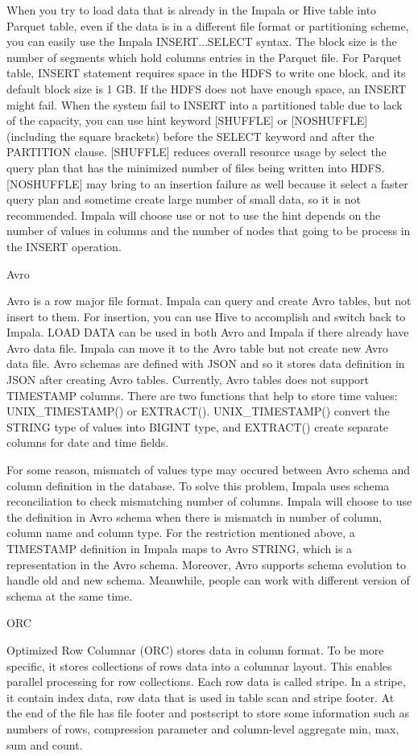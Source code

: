 \documentclass[onecolumn, draftclsnofoot,10pt, compsoc]{IEEEtran}
\begin{document}
When you try to load data that is already in the Impala or Hive table into Parquet table, even if the data is in a different file format or partitioning scheme, you can easily use the Impala INSERT...SELECT syntax.
The block size is the number of segments which hold columns entries in the Parquet file. 
For Parquet table, INSERT statement  requires space in the HDFS to write one block, and its default block size is 1 GB.
If the HDFS does not have enough space, an INSERT might fail.
When the system fail to INSERT into a partitioned table due to lack of the capacity, you can use hint keyword [SHUFFLE] or [NOSHUFFLE] (including the square brackets) before the SELECT keyword and after the PARTITION clause.
[SHUFFLE] reduces overall resource usage by select the query plan that has the minimized number of files being written into HDFS.
[NOSHUFFLE] may bring to an insertion failure as well because it select a faster query plan and sometime create large number of small data, so it is not recommended.
Impala will choose use or not to use the hint depends on the number of values in columns and the number of nodes that going to be process in the INSERT operation. 

Avro

Avro is a row major file format. 
Impala can query and create Avro tables, but not insert to them. 
For insertion, you can use Hive to accomplish and switch back to Impala.
LOAD DATA can be used in both Avro and Impala if there already have Avro data file.
Impala can move it to the Avro table but not create new Avro data file.
Avro schemas are defined with JSON and so it stores data definition in JSON after creating Avro tables.
Currently, Avro tables does not support TIMESTAMP columns.
There are two functions that help to store time values: UNIX\_TIMESTAMP() or EXTRACT(). UNIX\_TIMESTAMP() convert the STRING type of values into BIGINT type, and EXTRACT() create separate columns for date and time fields.

For some reason, mismatch of values type may occured between Avro schema and column definition in the database.
To solve this problem, Impala uses schema reconciliation to check mismatching number of columns.
Impala will choose to use the definition in Avro schema when there is mismatch in number of column, column name and column type.
For the restriction mentioned above, a TIMESTAMP definition in Impala maps to Avro STRING, which is a representation in the Avro schema.
Moreover, Avro supports schema evolution to handle old and new schema. Meanwhile, people can work with different version of schema at the same time.

ORC

Optimized Row Columnar (ORC) stores data in column format.
To be more specific, it stores collections of rows data into a columnar layout. This enables parallel processing for row collections.
Each row data is called stripe. In a stripe, it contain index data, row data that is used in table scan and stripe footer.
At the end of the file has file footer and postscript to store some information such as numbers of rows, compression parameter and column-level aggregate min, max, sum and count. 



\nocite{*}


\end{document}
